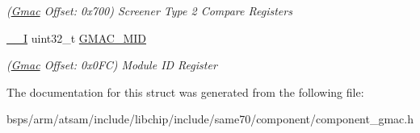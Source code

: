 \begin{DoxyCompactItemize}
\begin{DoxyCompactList}\small\item\em (\mbox{\hyperlink{structGmac}{Gmac}} Offset\+: 0x700) Screener Type 2 Compare Registers \end{DoxyCompactList}\item 
\mbox{\label{structGmac_a7b983508ef86aee3393059aa5ee7f906}} 
\mbox{\hyperlink{core__cm7_8h_af63697ed9952cc71e1225efe205f6cd3}{\+\_\+\+\_\+I}} uint32\+\_\+t \mbox{\hyperlink{structGmac_a7b983508ef86aee3393059aa5ee7f906}{G\+M\+A\+C\+\_\+\+M\+ID}}
\begin{DoxyCompactList}\small\item\em (\mbox{\hyperlink{structGmac}{Gmac}} Offset\+: 0x0\+FC) Module ID Register \end{DoxyCompactList}\end{DoxyCompactItemize}


The documentation for this struct was generated from the following file\+:\begin{DoxyCompactItemize}
\item 
bsps/arm/atsam/include/libchip/include/same70/component/component\+\_\+gmac.\+h\end{DoxyCompactItemize}
